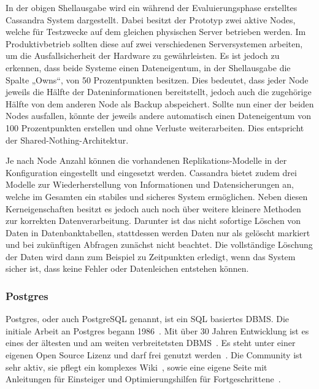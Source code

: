 In der obigen Shellausgabe wird ein während der Evaluierungsphase erstelltes
Cassandra System dargestellt. Dabei besitzt der Prototyp zwei aktive Nodes,
welche für Testzwecke auf dem gleichen physischen Server betrieben werden. Im
Produktivbetrieb sollten diese auf zwei verschiedenen Serversystemen arbeiten,
um die Ausfallsicherheit der Hardware zu gewährleisten. Es ist jedoch zu
erkennen, dass beide Systeme einen Dateneigentum, in der Shellausgabe die
Spalte „Owns“, von 50 Prozentpunkten besitzen. Dies bedeutet, dass jeder Node
jeweils die Hälfte der Dateninformationen bereitstellt, jedoch auch die
zugehörige Hälfte von dem anderen Node als Backup abspeichert. Sollte nun einer
der beiden Nodes ausfallen, könnte der jeweils andere automatisch einen
Dateneigentum von 100 Prozentpunkten erstellen und ohne Verluste
weiterarbeiten. Dies entspricht der \gls{Shared-Nothing-Architektur}.

Je nach Node Anzahl können die vorhandenen Replikations-Modelle in der
Konfiguration eingestellt und eingesetzt werden. Cassandra bietet zudem drei
Modelle zur Wiederherstellung von Informationen und Datensicherungen an, welche
im Gesamten ein stabiles und sicheres System ermöglichen. Neben diesen
Kerneigenschaften besitzt es jedoch auch noch über weitere kleinere Methoden
zur korrekten Datenverarbeitung. Darunter ist das nicht sofortige Löschen von
Daten in Datenbanktabellen, stattdessen werden Daten nur als gelöscht markiert
und bei zukünftigen Abfragen zunächst nicht beachtet. Die vollständige Löschung
der Daten wird dann zum Beispiel zu Zeitpunkten erledigt, wenn das System
sicher ist, dass keine Fehler oder Datenleichen entstehen können.
\nl%

\subsubsection{Postgres}
\label{subsubsec:postgres}
Postgres, oder auch PostgreSQL genannt, ist ein \gls{SQL} basiertes \gls{DBMS}.
Die initiale Arbeit an Postgres begann 1986~\cite{old_postgres}. Mit über 30
Jahren Entwicklung ist es eines der ältesten und am weiten verbreitetsten
DBMS~\cite{db_ranking}. Es steht unter einer eigenen Open Source Lizenz und
darf frei genutzt werden~\cite{postgres_license}. Die Community ist sehr aktiv,
sie pflegt ein komplexes Wiki~\cite{postgres_wiki}, sowie eine eigene Seite mit
Anleitungen für Einsteiger und Optimierungshilfen für
Fortgeschrittene~\cite{postgres_tutorial}.



